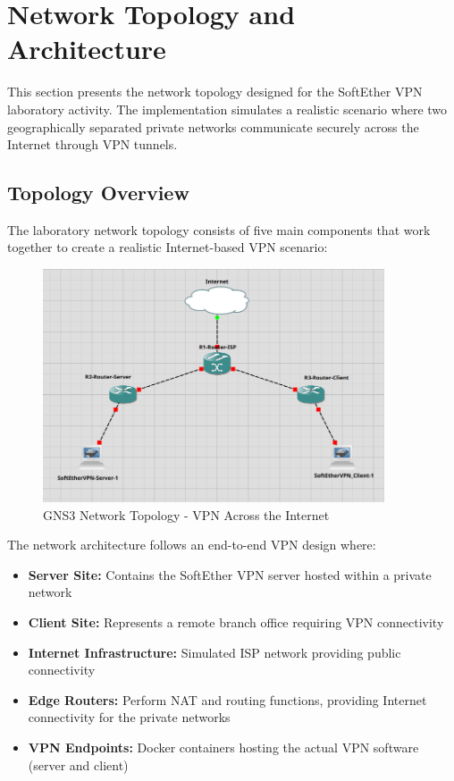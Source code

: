\newpage

\section{Network Topology and Architecture}

This section presents the network topology designed for the SoftEther VPN laboratory activity. The implementation simulates a realistic scenario where two geographically separated private networks communicate securely across the Internet through VPN tunnels. 

\subsection{Topology Overview}

The laboratory network topology consists of five main components that work together to create a realistic Internet-based VPN scenario:

\begin{figure}[H]
\centering
\includegraphics[width=0.9\textwidth]{../resources/Images/GNS3_Structure.png}
\caption{GNS3 Network Topology - VPN Across the Internet}
\label{fig:gns3_topology}
\end{figure}

The network architecture follows an end-to-end VPN design where:

\begin{itemize}
    \item \textbf{Server Site:} Contains the SoftEther VPN server hosted within a private network
    \item \textbf{Client Site:} Represents a remote branch office requiring VPN connectivity
    \item \textbf{Internet Infrastructure:} Simulated ISP network providing public connectivity
    \item \textbf{Edge Routers:} Perform NAT and routing functions, providing Internet connectivity for the private networks
    \item \textbf{VPN Endpoints:} Docker containers hosting the actual VPN software (server and client)
\end{itemize}

